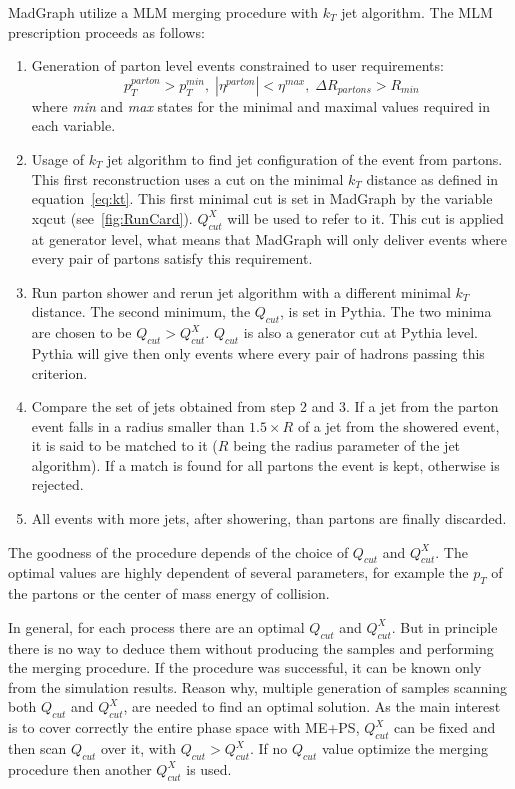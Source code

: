MadGraph utilize a MLM merging procedure with $k_{T}$ jet algorithm. The MLM prescription proceeds as follows:
\begin{enumerate}
\item Generation of parton level events constrained to user requirements:
  \begin{equation*}
    p_{T}^{parton}>p_{T}^{min}, \; |\eta^{parton}|<\eta^{max}, \; \Delta R_{partons}>R_{min}
  \end{equation*} where \textit{min} and \textit{max} states for the minimal and maximal values required in each variable.
\item Usage of $k_{T}$ jet algorithm to find jet configuration of the event from partons. This first reconstruction uses a cut on the minimal $k_{T}$ distance as defined in equation~\ref{eq:kt}. This first minimal cut is set in MadGraph by the variable xqcut (see~\ref{fig:RunCard}). $Q^{X}_{cut}$ will be used to refer to it. This cut is applied at generator level, what means that MadGraph will only deliver events where every pair of partons satisfy this requirement.
\item Run parton shower and rerun jet algorithm with a different minimal $k_{T}$ distance. The second minimum, the $Q_{cut}$, is set in Pythia. The two minima are chosen to be $Q_{cut}>Q^{X}_{cut}$. $Q_{cut}$ is also a generator cut at Pythia level. Pythia will give then only events where every pair of hadrons passing this criterion.
\item Compare the set of jets obtained from step 2 and 3. If a jet from the parton event falls in a radius smaller than $1.5 \times R$ of a jet from the showered event, it is said to be matched to it ($R$ being the radius parameter of the jet algorithm). If a match is found for all partons the event is kept, otherwise is rejected.
\item All events with more jets, after showering, than partons are finally discarded.   
\end{enumerate}

The goodness of the procedure depends of the choice of $Q_{cut}$ and $Q^{X}_{cut}$. The optimal values are highly dependent of several parameters, for example the $p_{T}$ of the partons or the center of mass energy of collision. 

In general, for each process there are an optimal $Q_{cut}$ and $Q^{X}_{cut}$. But in principle there is no way to deduce them without producing the samples and performing the merging procedure. If the procedure was successful, it can be known only from the simulation results. Reason why, multiple generation of samples scanning both $Q_{cut}$ and $Q^{X}_{cut}$, are needed to find an optimal solution. As the main interest is to cover correctly the entire phase space with ME+PS, $Q^{X}_{cut}$ can be fixed and then scan $Q_{cut}$ over it, with $Q_{cut}>Q^{X}_{cut}$. If no $Q_{cut}$ value optimize the merging procedure then another $Q^{X}_{cut}$ is used. 

